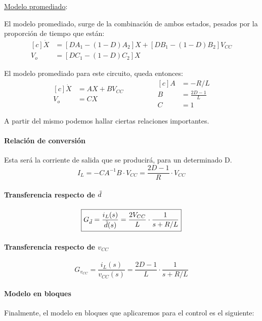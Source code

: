 \documentclass[titlepage, 12pt]{article}
\begin{document}
\underline{Modelo promediado}:
 
El modelo promediado, surge de la combinación de ambos estados, pesados por la proporción de tiempo que están:
\[
    \begin{aligned}[c]
        \Dot{X} &= [DA_1 - (1-D)A_2] X + [DB_1 - (1-D)B_2] V_{CC}\\
        V_o     &= [DC_1 - (1-D)C_2] X
    \end{aligned}
\]
 
El modelo promediado para este circuito, queda entonces:
 \begin{equation*}
    \boxed{
    \begin{aligned}[c]
        \Dot{X} &= A X + B V_{CC}\\
        V_o     &= C X
    \end{aligned}
    \qquad\qquad
    \begin{aligned}[c]
        A&=-R/L\\
        B&=\frac{2D-1}{L}\\
        C&=1
    \end{aligned}}
    \end{equation*}

A partir del mismo podemos hallar ciertas relaciones importantes.
    
\paragraph{Relación de conversión}
Esta será la corriente de salida que se producirá, para un determinado D.
\[ \boxed{
    I_L = -CA^{-1}B\cdot V_{CC} = \frac{2D-1}{R} \cdot V_{CC}
}\]

\paragraph{Transferencia respecto de $\Tilde{d}$}
\[ \boxed{
    G_{\Tilde{d}} = \frac{i_L(s)}{\Tilde{d}(s)} = \frac{2V_{CC}}{L} \cdot \frac{1}{s+R/L}
}\]

\paragraph{Transferencia respecto de $v_{CC}$}
\[ \boxed{
    G_{v_{CC}} = \frac{i_L(s)}{v_{CC}(s)} = \frac{2D-1}{L} \cdot \frac{1}{s+R/L}
}\]

\paragraph{Modelo en bloques}
Finalmente, el modelo en bloques que aplicaremos para el control es el siguiente:
\end{document}
